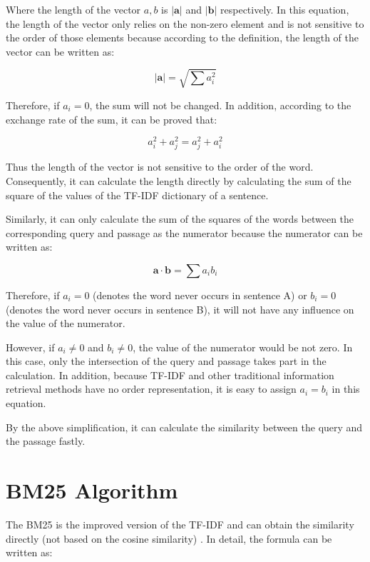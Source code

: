 \documentclass[11pt]{article}
\begin{document}
Where the length of the vector $a,b$ is $|\mathbf{a}|$ and $|\mathbf{b}|$ respectively. In this equation, the length of the vector only relies on the non-zero element and is not sensitive to the order of those elements because according to the definition, the length of the vector can be written as:

\begin{equation}
|\mathbf{a}| = \sqrt{\sum a^2_i}
\end{equation}

Therefore, if $a_i = 0$, the sum will not be changed. In addition, according to the exchange rate of the sum, it can be proved that:

\begin{equation}
a^2_i + a^2_j = a^2_j + a^2_i
\end{equation}

Thus the length of the vector is not sensitive to the order of the word. Consequently, it can calculate the length directly by calculating the sum of the square of the values of the TF-IDF dictionary of a sentence.

Similarly, it can only calculate the sum of the squares of the words between the corresponding query and passage as the numerator because the numerator can be written as:

\begin{equation}
\mathbf{a}\cdot\mathbf{b} = \sum a_ib_i
\end{equation}

Therefore, if $a_i = 0$ (denotes the word never occurs in sentence A) or $b_i = 0$ (denotes the word never occurs in sentence B), it will not have any influence on the value of the numerator. 

However, if $a_i \neq 0$ and $b_i \neq 0$, the value of the numerator would be not zero. In this case, only the intersection of the query and passage takes part in the calculation. In addition, because TF-IDF and other traditional information retrieval methods have no order representation, it is easy to assign $a_i = b_i $ in this equation.

By the above simplification, it can calculate the similarity between the query and the passage fastly.

\section{BM25 Algorithm}

The BM25 is the improved version of the TF-IDF and can obtain the similarity directly (not based on the cosine similarity) \cite{kadhim2019term}. In detail, the formula can be written as:
\end{document}
